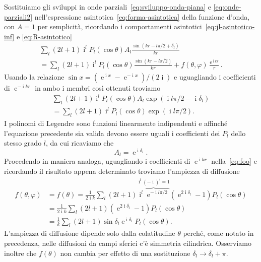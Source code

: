 \documentclass[a4paper,fleqn,twoside,12pt]{article}
\renewcommand{\phi}{\varphi}
\DeclareMathOperator{\e}{\mathrm{e}} %
\DeclareMathOperator{\uimm}{\mathrm{i}} %
\begin{document}
Sostituiamo gli sviluppi in onde parziali~\eqref{eq:sviluppo-onda-piana} e
\eqref{eq:onde-parziali2} nell'espressione
asintotica~\eqref{eq:forma-asintotica} della funzione d'onda, con $A = 1$ per
semplicità, ricordando i comportamenti asintotici~\eqref{eq:jl-asintotico-inf} e
\eqref{eq:R-asintotico}
\begin{multline}
  \label{eq:foo}
  \sum_{l}(2l+1)\uimm^{l}P_{l}(\cos\theta)A_{l}\frac{\sin(kr - l\pi/2 +
    \delta_{l})}{kr} \\
  = \sum_{l}(2l+1)\uimm^{l} P_{l}(\cos\theta)\frac{\sin(kr - l\pi/2)}{kr} +
  f(\theta,\phi)\frac{\e^{\uimm kr}}{r}.
\end{multline}
Usando la relazione $\sin x = (\e^{\uimm x} - \e^{-\uimm x})/(2\uimm)$ e
uguagliando i coefficienti di $\e^{-\uimm kr}$ in ambo i membri così ottenuti
troviamo
\begin{multline}
  \sum_{l}(2l+1)\uimm^{l}P_{l}(\cos\theta)A_{l}\exp(\uimm l\pi/2 -
  \uimm\delta_{l}) \\
  = \sum_{l}(2l+1)\uimm^{l}P_{l}(\cos\theta)\exp(\uimm l\pi/2).
\end{multline}
I polinomi di Legendre sono funzioni linearmente indipendenti e affinché
l'equazione precedente sia valida devono essere uguali i coefficienti dei
$P_{l}$ dello stesso grado $l$, da cui ricaviamo che
\begin{equation}
  A_{l} = \e^{\uimm \delta_{l}}.
\end{equation}
Procedendo in maniera analoga, uguagliando i coefficienti di $\e^{\uimm kr}$
nella~\eqref{eq:foo} e ricordando il risultato appena determinato troviamo
l'ampiezza di diffusione
\begin{equation}
  \label{eq:ampiezza-diffusione-op}
  \begin{split}
    f(\theta,\phi) &= f(\theta) = \frac{1}{2\uimm k}\sum_{l}(2l+1)
    \overbrace{\uimm^{l}\e^{-\uimm l\pi/2}}^{\uimm^{l}(-\uimm)^{l}=1}
    (\e^{2\uimm\delta_{l}} - 1)P_{l}(\cos\theta) \\
    &= \frac{1}{2\uimm k}\sum_{l}(2l+1)(\e^{2\uimm\delta_{l}} - 1)
    P_{l}(\cos\theta) \\
    &= \frac{1}{k} \sum_{l} (2l+1) \sin\delta_{l} \e^{\uimm\delta_{l}}
    P_{l}(\cos\theta).
  \end{split}
\end{equation}
L'ampiezza di diffusione dipende solo dalla colatitudine $\theta$ perché, come
notato in precedenza, nelle diffusioni da campi sferici c'è simmetria
cilindrica.  Osserviamo inoltre che $f(\theta)$ non cambia per effetto di una
sostituzione $\delta_{l} \to \delta_{l} + \pi$.
\end{document}
